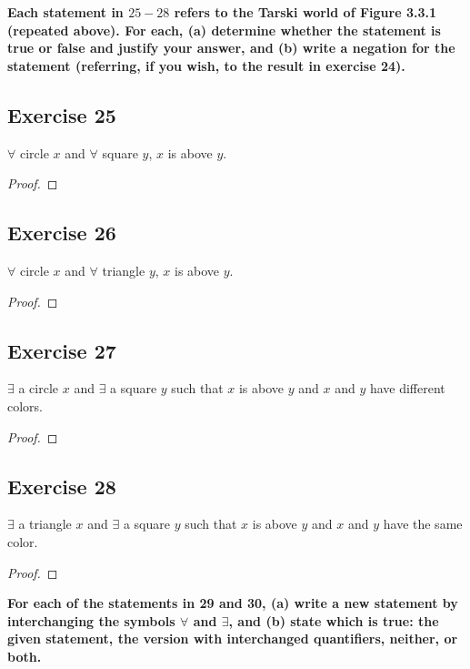 \documentclass[14pt]{extarticle}
\newcommand{\fa}{\forall}
\newcommand{\te}{\exists}
\begin{document}
{\bf \color{cyan} Each statement in $25-28$ refers to the Tarski world of Figure 3.3.1 (repeated above). For each, (a) determine whether the statement is true or false and justify your answer, and (b) write a negation for the statement (referring, if you wish, to the result in exercise 24).}

\subsection{Exercise 25}
$\fa$ circle $x$ and $\fa$ square $y$, $x$ is above $y$.

\begin{proof}

\end{proof}

\subsection{Exercise 26}
$\fa$ circle $x$ and $\fa$ triangle $y$, $x$ is above $y$.

\begin{proof}

\end{proof}

\subsection{Exercise 27}
$\te$ a circle $x$ and $\te$ a square $y$ such that $x$ is above $y$ and $x$ and $y$ have different colors.

\begin{proof}

\end{proof}

\subsection{Exercise 28}
$\te$ a triangle $x$ and $\te$ a square $y$ such that $x$ is above $y$ and $x$ and $y$ have the same color.

\begin{proof}

\end{proof}

{\bf \color{cyan} For each of the statements in 29 and 30, (a) write a new statement by interchanging the symbols $\fa$ and $\te$, and (b) state which is true: the given statement, the version with interchanged quantifiers, neither, or both.}
\end{document}

